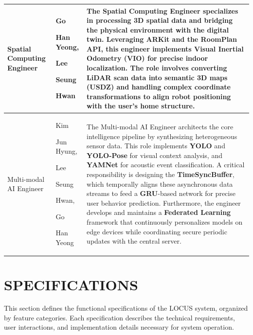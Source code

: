 \documentclass[conference]{IEEEtran}
\begin{document}
\begin{enumerate}
\begin{table}[H]
\begin{tabular}{|p{1.2cm}|p{1.2cm}|p{5.4cm}|}
    Spatial Computing Engineer & Go \par Han Yeong, \par Lee \par Seung \par Hwan  & The Spatial Computing Engineer specializes in processing 3D spatial data and bridging the physical environment with the digital twin. Leveraging ARKit and the RoomPlan API, this engineer implements Visual Inertial Odometry (VIO) for precise indoor localization. The role involves converting LiDAR scan data into semantic 3D maps (USDZ) and handling complex coordinate transformations to align robot positioning with the user's home structure. \\
    \hline
    
    Multi-modal AI Engineer &  Kim \par Jun Hyung, \par Lee \par Seung \par Hwan, \par Go \par Han Yeong & The Multi-modal AI Engineer architects the core intelligence pipeline by synthesizing heterogeneous sensor data. This role implements \textbf{YOLO} and \textbf{YOLO-Pose} for visual context analysis, and \textbf{YAMNet} for acoustic event classification. A critical responsibility is designing the \textbf{TimeSyncBuffer}, which temporally aligns these asynchronous data streams to feed a \textbf{GRU}-based network for precise user behavior prediction. Furthermore, the engineer develops and maintains a \textbf{Federated Learning} framework that continuously personalizes models on edge devices while coordinating secure periodic updates with the central server. \\
    \hline



    \end{tabular}

\end{table}
\end{enumerate}

\section{SPECIFICATIONS}

This section defines the functional specifications of the LOCUS system, organized by feature categories. Each specification describes the technical requirements, user interactions, and implementation details necessary for system operation.
\end{document}
